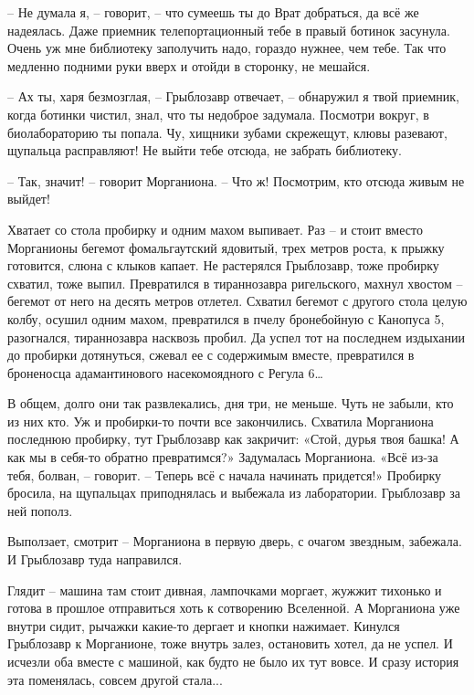 \documentclass[ebook,oneside,final,openright]{memoir}
\begin{document}
\par
– Не думала я, – говорит, – что сумеешь ты до Врат добраться, да всё же надеялась. Даже приемник телепортационный тебе в правый ботинок засунула. Очень уж мне библиотеку заполучить надо, гораздо нужнее, чем тебе. Так что медленно подними руки вверх и отойди в сторонку, не мешайся.\par
– Ах ты, харя безмозглая, – Грыблозавр отвечает, – обнаружил я твой приемник, когда ботинки чистил, знал, что ты недоброе задумала. Посмотри вокруг, в биолабораторию ты попала. Чу, хищники зубами скрежещут, клювы разевают, щупальца расправляют! Не выйти тебе отсюда, не забрать библиотеку.\par
– Так, значит! – говорит Морганиона. – Что ж! Посмотрим, кто отсюда живым не выйдет!\par
\par
Хватает со стола пробирку и одним махом выпивает. Раз – и стоит вместо Морганионы бегемот фомальгаутский ядовитый, трех метров роста, к прыжку готовится, слюна с клыков капает. Не растерялся Грыблозавр, тоже пробирку схватил, тоже выпил. Превратился в тираннозавра ригельского, махнул хвостом – бегемот от него на десять метров отлетел. Схватил бегемот с другого стола целую колбу, осушил одним махом, превратился в пчелу бронебойную с Канопуса 5, разогнался, тираннозавра насквозь пробил. Да успел тот на последнем издыхании до пробирки дотянуться, сжевал ее с содержимым вместе, превратился в броненосца адамантинового насекомоядного с Регула 6…\par
\par
В общем, долго они так развлекались, дня три, не меньше. Чуть не забыли, кто из них кто. Уж и пробирки-то почти все закончились. Схватила Морганиона последнюю пробирку, тут Грыблозавр как закричит: «Стой, дурья твоя башка! А как мы в себя-то обратно превратимся?» Задумалась Морганиона. «Всё из-за тебя, болван, – говорит. – Теперь всё с начала начинать придется!» Пробирку бросила, на щупальцах приподнялась и выбежала из лаборатории. Грыблозавр за ней пополз.\par
\par
Выползает, смотрит – Морганиона в первую дверь, с очагом звездным, забежала. И Грыблозавр туда направился.\par
\par
Глядит – машина там стоит дивная, лампочками моргает, жужжит тихонько и готова в прошлое отправиться хоть к сотворению Вселенной. А Морганиона уже внутри сидит, рычажки какие-то дергает и кнопки нажимает. Кинулся Грыблозавр к Морганионе, тоже внутрь залез, остановить хотел, да не успел. И исчезли оба вместе с машиной, как будто не было их тут вовсе. И сразу история эта поменялась, совсем другой стала...\par
\end{document}
